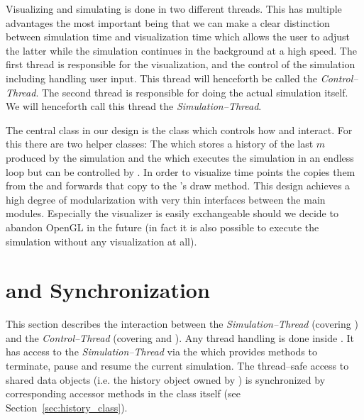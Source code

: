 \noindent
Visualizing and simulating is done in two different threads. This has multiple advantages the most important being that we can make a clear distinction between simulation time and visualization time which allows the user to adjust the latter while the simulation continues in the background at a high speed. The first thread is responsible for the visualization, and the control of the simulation including handling user input. This thread will henceforth be called the \emph{Control--Thread}. The second thread is responsible for doing the actual simulation itself. We will henceforth call this thread the \emph{Simulation--Thread}.\smallskip

\noindent
The central class in our design is the  class which controls how  and  interact. For this there are two helper classes: The  which stores a history of the last $m$  produced by the simulation and the  which executes the simulation in an endless loop but can be controlled by . In order to visualize time points the  copies them from the  and forwards that copy to the 's draw method. This design achieves a high degree of modularization with very thin interfaces between the main modules. Especially the visualizer is easily exchangeable should we decide to abandon OpenGL in the future (in fact it is also possible to execute the simulation without any visualization at all). 

\section{ and Synchronization}\label{sec:synchronization}

This section describes the interaction between the \emph{Simulation--Thread} (covering ) and the \emph{Control--Thread} (covering  and ). Any thread handling is done inside . It has access to the \emph{Simulation--Thread} via the  which provides methods to terminate, pause and resume the current simulation. The thread--safe access to shared data objects (i.e. the history object owned by ) is synchronized by corresponding accessor methods in the  class itself (see Section~\ref{sec:history_class}).

